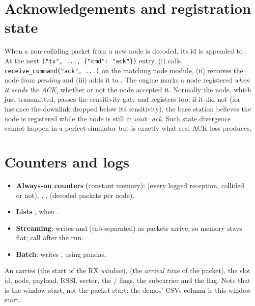 \section{Acknowledgements and registration state}
\label{sec:acks}

When a non-colliding packet from a new node is decoded, its id is appended to . At the next \texttt{("tx", ..., \{"cmd": "ack"\})} entry,  (i) calls \texttt{receive\_command("ack", ...)} on the matching node module, (ii) removes the node from \emph{pending} and (iii) adds it to . The engine marks a node registered \emph{when it sends the ACK}, whether or not the node accepted it. Normally the node, which just transmitted, passes the sensitivity gate and registers too; if it did not (for instance the downlink dropped below its sensitivity), the base station believes the node is registered while the node is still in \emph{wait\_ack}. Such state divergence cannot happen in a perfect simulator but is exactly what real ACK loss produces.

\section{Counters and logs}
\label{sec:bslogs}

\begin{itemize}
 \item \textbf{Always-on counters} (constant memory):  (every logged reception, collided or not), , ,  (decoded packets per node).
 \item \textbf{Lists} ,  when .
 \item \textbf{Streaming}:  writes  and  (tab-separated) as packets arrive, so memory stays flat; call  after the run.
 \item \textbf{Batch}:  writes ,  using pandas.
\end{itemize}
An  carries  (the start of the RX \emph{window}),  (the \emph{arrival time} of the packet), the slot id, node, payload, RSSI, sector, the / flags, the subcarrier and the  flag. Note that  is the window start, not the packet start: the demos' CSVs  column is this window start.

